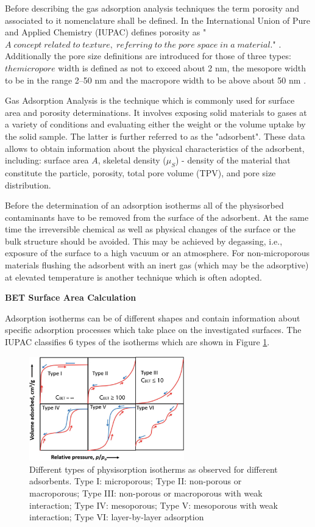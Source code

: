 Before describing the gas adsorption analysis techniques the term porosity and associated to it nomenclature shall be defined. In the International Union of Pure and Applied Chemistry (IUPAC) defines porosity as "$A\;concept\;related\;to\;texture,\;referring\;to\;the\;pore\;space\;in\;a\;material.$" \cite{noauthor__1976}. Additionally the pore size definitions are introduced for those of three types: $the micropore$ width is defined as not to exceed about 2 nm, the mesopore width to be in the range 2–50 nm and the macropore width to be above about 50 nm \cite{SING19911}.

Gas Adsorption Analysis is the technique which is commonly used for surface area and porosity determinations. It involves exposing solid materials to gases at a variety of conditions and evaluating either the weight or the volume uptake by the solid sample. The latter is further referred to as the "adsorbent". These data allows to obtain information about the physical characteristics of the adsorbent, including: surface area $A$, skeletal density ($\mu_S$) - density of the material that constitute the particle, porosity, total pore volume (TPV), and pore size distribution.

Before the determination of an adsorption isotherms all of the physisorbed contaminants have to be removed from the surface of the adsorbent. At the same time the irreversible chemical as well as physical changes of the surface or the bulk structure should be avoided. This may be achieved by degassing, i.e., exposure of the surface to a high vacuum or an atmosphere. For non-microporous materials flushing the adsorbent with an inert gas (which may be the adsorptive) at elevated temperature is another technique which is often adopted. 

\medskip
\textbf{BET Surface Area Calculation}

Adsorption isotherms can be of different shapes and contain information about specific adsorption processes which take place on the investigated surfaces. The IUPAC classifies 6 types of the isotherms which are shown in Figure \ref{fig:isotherms_types}. 

\begin{figure}[H]
\centering
\includegraphics[width=0.6\textwidth]{Figures/Theory/isotherms_types.jpg}
\medskip
\caption{Different types of physisorption isotherms as observed for different adsorbents. Type I: microporous; Type II: non-porous or macroporous; Type III: non-porous or macroporous with weak interaction; Type IV: mesoporous; Type V: mesoporous with weak interaction; Type VI: layer-by-layer adsorption \cite{Kumar}}
\label{fig:isotherms_types}
\end{figure}

